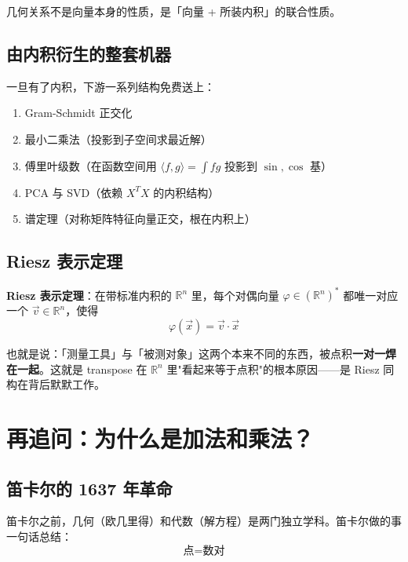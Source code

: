 \documentclass[11pt,a4paper]{article}
\begin{document}
\begin{summary}
    几何关系不是向量本身的性质，是「向量 + 所装内积」的联合性质。
\end{summary}

\subsection{由内积衍生的整套机器}

一旦有了内积，下游一系列结构免费送上：
\begin{enumerate}
    \item Gram-Schmidt 正交化
    \item 最小二乘法（投影到子空间求最近解）
    \item 傅里叶级数（在函数空间用 $\langle f,g\rangle = \int fg$ 投影到 $\sin, \cos$ 基）
    \item PCA 与 SVD（依赖 $X^TX$ 的内积结构）
    \item 谱定理（对称矩阵特征向量正交，根在内积上）
\end{enumerate}

\subsection{Riesz 表示定理}

\begin{insight}
    \textbf{Riesz 表示定理}：在带标准内积的 $\mathbb{R}^n$ 里，每个对偶向量 $\varphi \in (\mathbb{R}^n)^*$ 都唯一对应一个 $\vec{v} \in \mathbb{R}^n$，使得
    $$\varphi(\vec{x}) = \vec{v} \cdot \vec{x}$$

    也就是说：「测量工具」与「被测对象」这两个本来不同的东西，被点积\textbf{一对一焊在一起}。这就是 transpose 在 $\mathbb{R}^n$ 里"看起来等于点积"的根本原因——是 Riesz 同构在背后默默工作。
\end{insight}

\section{再追问：为什么是加法和乘法？}

\subsection{笛卡尔的 1637 年革命}

笛卡尔之前，几何（欧几里得）和代数（解方程）是两门独立学科。笛卡尔做的事一句话总结：
$$\boxed{\text{点} = \text{数对}}$$
\end{document}
